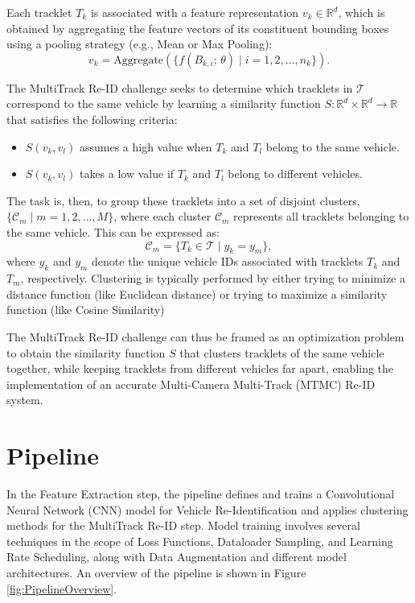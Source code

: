 Each tracklet $T_k$ is associated with a feature representation $v_k \in \mathbb{R}^d$, which is obtained by aggregating the feature vectors of its constituent bounding boxes using a pooling strategy (e.g., Mean or Max Pooling):
\[
    v_k = \text{Aggregate}(\{f(B_{k, i}; \,\theta) \mid i = 1, 2, \ldots, n_k\}).
\]

The MultiTrack Re-ID challenge seeks to determine which tracklets in $\mathcal{T}$ correspond to the same vehicle by learning a similarity function $S: \mathbb{R}^d \times \mathbb{R}^d \to \mathbb{R}$ that satisfies the following criteria:
\begin{itemize}
    \item $S(v_k, v_l)$ assumes a high value when $T_k$ and $T_l$ belong to the same vehicle.
    \item $S(v_k, v_l)$ takes a low value if $T_k$ and $T_l$ belong to different vehicles.
\end{itemize}

The task is, then, to group these tracklets into a set of disjoint clusters, $\{\mathcal{C}_m \mid m = 1, 2, \ldots, M\}$, where each cluster $\mathcal{C}_m$ represents all tracklets belonging to the same vehicle. This can be expressed as:
\[
    \mathcal{C}_m = \{T_k \in \mathcal{T} \mid y_k = y_m\},
\]
where $y_k$ and $y_m$ denote the unique vehicle IDs associated with tracklets $T_k$ and $T_m$, respectively. Clustering is typically performed by either trying to minimize a distance function (like Euclidean distance) or trying to maximize a similarity function (like Cosine Similarity)

The MultiTrack Re-ID challenge can thus be framed as an optimization problem to obtain the similarity function $S$ that clusters tracklets of the same vehicle together, while keeping tracklets from different vehicles far apart, enabling the implementation of an accurate Multi-Camera Multi-Track (MTMC) Re-ID system.

\section{Pipeline}
In the Feature Extraction step, the pipeline defines and trains a Convolutional Neural Network (CNN) model for Vehicle Re-Identification and applies clustering methods for the MultiTrack Re-ID step. Model training involves several techniques in the scope of Loss Functions, Dataloader Sampling, and Learning Rate Scheduling, along with Data Augmentation and different model architectures. An overview of the pipeline is shown in Figure \ref{fig:PipelineOverview}.

